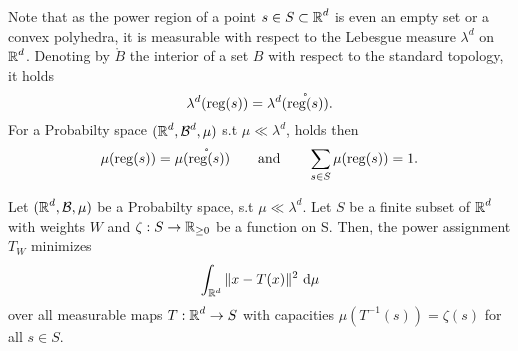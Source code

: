 \documentclass[
     12pt,         %
     a4paper,      %
     BCOR=10mm,     %
     DIV=14,        %
     ]{scrreprt}
\begin{document}
%
%
%
    \begin{rem*} \label{rem::measurabilty}
        Note that as the power region of a point $s\in S\subset \operatorname{\mathbb{R}}^d$ is even an empty set or a convex polyhedra, it is measurable with respect to the Lebesgue measure $\lambda^d$ on $\operatorname{\mathbb{R}}^d$.
        Denoting by $\mathring B$ the interior of a set $B$ with respect to the standard topology, it holds 
        \[\lambda^d(\operatorname{reg}(s)) = \lambda^d(\mathring{\operatorname{reg}(s)}).\]
        For a Probabilty space $(\operatorname{\mathbb{R}}^d,\operatorname{\mathcal{B}}^d,\mu)$ s.t $\mu \ll \lambda^d$, holds then
        \[\mu(\operatorname{reg}(s)) = \mu(\mathring{\operatorname{reg}(s)}) \quad \quad \text{and} \quad \quad \sum_{s\in S} \mu(\operatorname{reg}(s))=1.\]

        
    \end{rem*}
    \begin{lem} \label{lemma::1step}
        Let $(\operatorname{\mathbb{R}}^d,\operatorname{\mathcal{B}},\mu)$ be a Probabilty space, s.t $\mu \ll \lambda^d$.  Let $S$ be a finite subset of $\operatorname{\mathbb{R}}^d$ with weights $W$ and $\zeta: S \to \operatorname{\mathbb{R}}_{\ge 0}$ be a function on S.
        Then, the power assignment $T_W $ minimizes 
        \[\int_{\operatorname{\mathbb{R}}^d} \|x-T(x) \|^2 \ {\operatorname{{\mathrm{d}}}} \mu \]
        over all measurable maps $T : \operatorname{\mathbb{R}}^d \to S $ with capacities $\mu(T^{-1} (s)) = \zeta(s)  $ for all $s\in S$.
    \end{lem}
\end{document}
